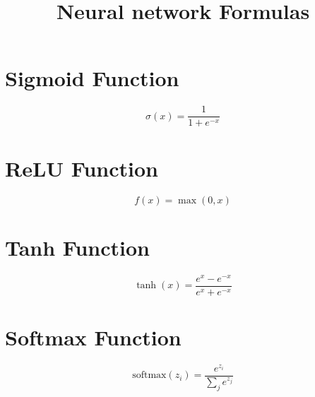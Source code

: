 \documentclass{article}
\title{Neural network Formulas }
\date{}
\begin{document}
\maketitle

\section*{Sigmoid Function}
\[\sigma(x) = \frac{1}{1 + e^{-x}} \]
\section*{ReLU Function}
\[f(x) = \max(0, x) \]
\section*{Tanh Function}
\[\tanh(x) = \frac{e^x - e^{-x}}{e^x + e^{-x}} \]
\section*{Softmax Function}
\[\text{softmax}(z_i) = \frac{e^{z_i}}{\sum_{j} e^{z_j}} \] 
\end{document}
